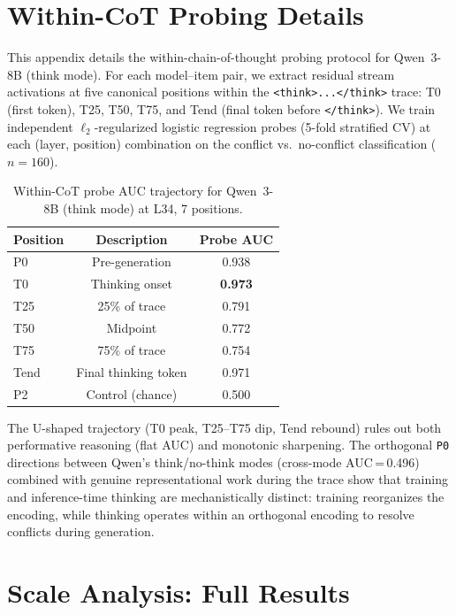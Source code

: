 \documentclass{article}
\newcommand{\pzero}{\texttt{P0}}
\begin{document}
\appendix

\section{Within-CoT Probing Details}
\label{app:within_cot}

This appendix details the within-chain-of-thought probing protocol
for Qwen~3-8B (think mode).  For each model--item pair, we extract
residual stream activations at five canonical positions within the
\texttt{<think>...\allowbreak</think>} trace: T0 (first token), T25,
T50, T75, and Tend (final token before \texttt{</think>}).  We train
independent $\ell_2$-regularized logistic regression probes (5-fold
stratified CV) at each (layer, position) combination on the conflict
vs.\ no-conflict classification ($n = 160$).

\begin{table}[ht]
\centering
\caption{Within-CoT probe AUC trajectory for Qwen~3-8B (think mode)
  at L34, 7 positions.}
\label{tab:within_cot_qwen}
\vspace{4pt}
\small
\begin{tabular}{lcc}
\toprule
\textbf{Position} & \textbf{Description} & \textbf{Probe AUC} \\
\midrule
P0   & Pre-generation          & 0.938 \\
T0   & Thinking onset          & \textbf{0.973} \\
T25  & 25\% of trace           & 0.791 \\
T50  & Midpoint                & 0.772 \\
T75  & 75\% of trace           & 0.754 \\
Tend & Final thinking token    & 0.971 \\
P2   & Control (chance)        & 0.500 \\
\bottomrule
\end{tabular}
\end{table}

The U-shaped trajectory (T0 peak, T25--T75 dip, Tend rebound) rules
out both performative reasoning (flat AUC) and monotonic sharpening.
The orthogonal \pzero{} directions between Qwen's think/no-think modes
(cross-mode AUC\,=\,0.496) combined with genuine representational work
during the trace show that training and inference-time thinking are
mechanistically distinct: training reorganizes the encoding, while
thinking operates within an orthogonal encoding to resolve conflicts
during generation.

\section{Scale Analysis: Full Results}
\label{app:scale}
\end{document}
